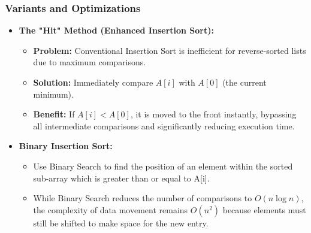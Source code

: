     \subsubsection{Variants and Optimizations}
        \begin{itemize}
            \item \textbf{The "Hit" Method (Enhanced Insertion Sort)\cite{sodhi2013enhanced}:}
            \begin{itemize}
                \item \textbf{Problem:} Conventional Insertion Sort is inefficient for reverse-sorted lists due to maximum comparisons.
                \item \textbf{Solution:} Immediately compare $A[i]$ with $A[0]$ (the current minimum).
                \item \textbf{Benefit:} If $A[i] < A[0]$, it is moved to the front instantly, bypassing all intermediate comparisons and significantly reducing execution time.
            \end{itemize}
            \item \textbf{Binary Insertion Sort:}
            \begin{itemize}
                \item Use Binary Search to find the position of an element within the sorted sub-array which is greater than or equal to A[i].
                \item While Binary Search reduces the number of comparisons to $O(n \log n)$, the complexity of data movement remains $O(n^2)$ because elements must still be shifted to make space for the new entry.
            \end{itemize}
        \end{itemize}